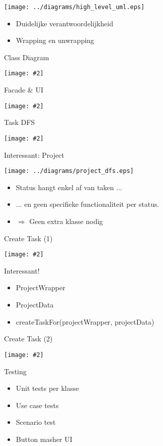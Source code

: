 \documentclass[mathserif,serif]{beamer}
\newcommand {\framedgraphic}[2] {
    \begin{frame}{#1}
        \begin{center}
            \texttt{[image: \#2]}
        \end{center}
    \end{frame}
}
\begin{document}
  \begin{frame}
      \begin{center}
      \texttt{[image: ../diagrams/high\_level\_uml.eps]}
        \begin{itemize}
        \item Duidelijke verantwoordelijkheid
        \item Wrapping en unwrapping
        \end{itemize}
      \end{center}
  \end{frame} 
  \framedgraphic{Class Diagram}{../diagrams/domain_uml.eps}
  \framedgraphic{Facade \& UI}{../diagrams/facade_uml.eps}
  \framedgraphic{Task DFS}{../diagrams/task_dfs.eps}
  \begin{frame}{Interessant: Project}
      \begin{center}
      \texttt{[image: ../diagrams/project\_dfs.eps]}
        \begin{itemize}
        \item Status hangt enkel af van taken ...
        \item ... en geen specifieke functionaliteit per status.
        \item $\Rightarrow$ Geen extra klasse nodig
        \end{itemize}
      \end{center}
  \end{frame} 
  \framedgraphic{Create Task (1)}{../diagrams/sequence_createTask_uml.eps}
  \begin{frame}{Interessant!}
      \begin{center}
        \begin{itemize}
        \item ProjectWrapper
        \item ProjectData   
        \item createTaskFor(projectWrapper, projectData)
        \end{itemize}
      \end{center}
  \end{frame}
  \framedgraphic{Create Task (2)}{../diagrams/sequence_createTask_cancel_uml.eps}
  \begin{frame}{Testing}
      \begin{center}
        \begin{itemize}
        \item Unit tests per klasse
        \item Use case tests
        \item Scenario test
        \item Button masher UI
        \end{itemize}
      \end{center}
  \end{frame} 

\end{document}
